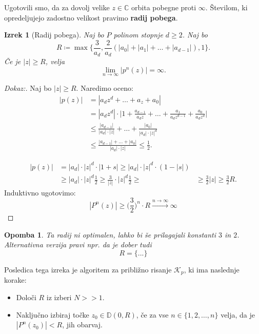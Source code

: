 \documentclass{article}
\newtheorem{opomba}{Opomba}
\newtheorem{izrek}{Izrek}
\newcommand{\C}{\mathbb{C}}
\newcommand{\D}{\mathbb{D}}
\begin{document}
Ugotovili smo, da za dovolj velike $z\in \C$ orbita pobegne proti $\infty$.
Številom, ki opredeljujejo zadostno velikost pravimo \textbf{radij pobega}.

\begin{izrek}[Radij pobega]
Naj bo $P$ polinom stopnje $d\geq 2$. Naj bo 
\begin{equation}
R \coloneqq \max\Big\{\frac{3}{a_d}, \frac{2}{a_d}(|a_0| + |a_1| + \dots + |a_{d-1}|)
, 1 \Big\}.
\end{equation}
Če je $|z| \geq R$, velja 
\begin{equation}
\lim_{n\rightarrow \infty} |p^n(z)| = \infty.
\end{equation}
\end{izrek}

\begin{proof}[Dokaz:]
Naj bo $|z| \geq R$. Naredimo oceno: 
\begin{align*}
|p(z)| &= |a_d z^d + \dots + a_z + a_0| \\
&= |a_d z^d| \cdot \Bigg|1 + \frac{a_{d-1}}{a_d z} + \dots + \frac{a_1}{a_d z^{d-1}} + \frac{a_0}{a_d z^d}\Bigg| \\
&\leq \frac{|a_{d-1}|}{|a_d|\cdot |z|} + \dots + \frac{|a_0|}{|a_d|\cdot |z|^d} \\
&\leq \frac{|a_{d-1}| + \dots + |a_0|}{|a_d| \cdot |z|} \leq \frac{1}{2}.
\end{align*}

\begin{align*}
|p(z)| &= |a_d| \cdot |z|^d \cdot |1 + s| \geq |a_d|\cdot |z|^d \cdot (1 - |s|)\\
&\geq |a_d| \cdot |z|^d \frac{1}{2} \geq \frac{3}{|z|} \cdot |z|^d \frac{1}{2} \geq
&\geq \frac{3}{2} |z| \geq \frac{3}{2} R.
\end{align*}
Induktivno ugotovimo:
$$
|P^n(z)| \geq \Big(\frac{3}{2} \Big)^n \cdot R \xrightarrow{n\rightarrow \infty} \infty
$$
\end{proof}

\begin{opomba}
Ta radij ni optimalen, lahko bi še prilagajali konstanti $3$ in $2$. 
Alternativna verzija pravi npr. da je dober tudi 
$$
R = \Big\{... \Big\}
$$
\end{opomba}

Posledica tega izreka je algoritem za približno risanje $\mathcal{K}_p$, ki 
ima naslednje korake:
\begin{itemize}
    \item Določi $R$ iz izberi $N>> 1$.
    \item Naključno izbiraj točke $z_0 \in \D(0, R)$, če za vse $n\in \{1, 2, \dots, n\}$
    velja, da je $|P^n(z_0)| < R$, jih obarvaj.
\end{itemize}
\end{document}
